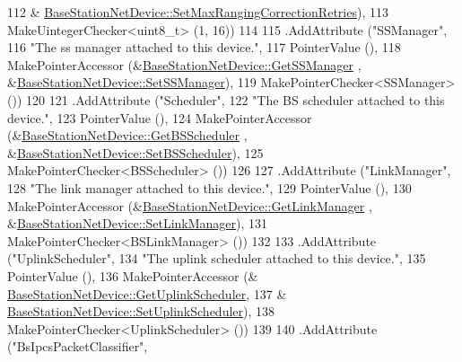 \begin{DoxyCode}
112                                          &
      \hyperlink{classns3_1_1BaseStationNetDevice_a5202fb3b9f83342bff19424df94942db}{BaseStationNetDevice::SetMaxRangingCorrectionRetries}),
113                    MakeUintegerChecker<uint8\_t> (1, 16))
114 
115     .AddAttribute (\textcolor{stringliteral}{"SSManager"},
116                    \textcolor{stringliteral}{"The ss manager attached to this device."},
117                    PointerValue (),
118                    MakePointerAccessor (&\hyperlink{classns3_1_1BaseStationNetDevice_afb45a043d6764f46a347d46915491e63}{BaseStationNetDevice::GetSSManager}
      , &\hyperlink{classns3_1_1BaseStationNetDevice_a921d119b9954e089d10c32f2f665d4f5}{BaseStationNetDevice::SetSSManager}),
119                    MakePointerChecker<SSManager> ())
120 
121     .AddAttribute (\textcolor{stringliteral}{"Scheduler"},
122                    \textcolor{stringliteral}{"The BS scheduler attached to this device."},
123                    PointerValue (),
124                    MakePointerAccessor (&\hyperlink{classns3_1_1BaseStationNetDevice_a2bfa87e4c2840ef970103fc164180454}{BaseStationNetDevice::GetBSScheduler}
      , &\hyperlink{classns3_1_1BaseStationNetDevice_a5fd557fae157f3110bd1efe3c1471638}{BaseStationNetDevice::SetBSScheduler}),
125                    MakePointerChecker<BSScheduler> ())
126 
127     .AddAttribute (\textcolor{stringliteral}{"LinkManager"},
128                    \textcolor{stringliteral}{"The link manager attached to this device."},
129                    PointerValue (),
130                    MakePointerAccessor (&\hyperlink{classns3_1_1BaseStationNetDevice_a117bfefcc35c47cb4fd564e77d2bc7e0}{BaseStationNetDevice::GetLinkManager}
      , &\hyperlink{classns3_1_1BaseStationNetDevice_a9bfffdc229d2c1cd7003a7dc0f26396b}{BaseStationNetDevice::SetLinkManager}),
131                    MakePointerChecker<BSLinkManager> ())
132 
133     .AddAttribute (\textcolor{stringliteral}{"UplinkScheduler"},
134                    \textcolor{stringliteral}{"The uplink scheduler attached to this device."},
135                    PointerValue (),
136                    MakePointerAccessor (&
      \hyperlink{classns3_1_1BaseStationNetDevice_a68899b936f7a8c294d6925e5b2162bf1}{BaseStationNetDevice::GetUplinkScheduler},
137                                         &
      \hyperlink{classns3_1_1BaseStationNetDevice_aa6a2b9f075d44384e600fae0e771f0d8}{BaseStationNetDevice::SetUplinkScheduler}),
138                    MakePointerChecker<UplinkScheduler> ())
139 
140     .AddAttribute (\textcolor{stringliteral}{"BsIpcsPacketClassifier"},

\end{DoxyCode}
